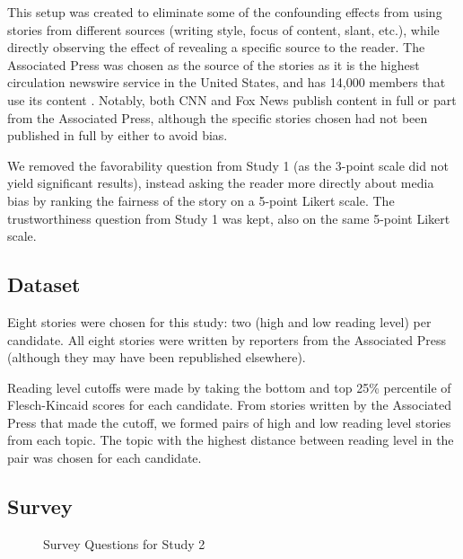 This setup was created to eliminate some of the confounding effects from using stories from different sources (writing style, focus of content, slant, etc.), while directly observing the effect of revealing a specific source to the reader. The Associated Press was chosen as the source of the stories as it is the highest circulation newswire service in the United States, and has 14,000 members that use its content \cite{apFAQ}. Notably, both CNN and Fox News publish content in full or part from the Associated Press, although the specific stories chosen had not been published in full by either to avoid bias.

We removed the favorability question from Study 1 (as the 3-point scale did not yield significant results), instead asking the reader more directly about media bias by ranking the fairness of the story on a 5-point Likert scale. The trustworthiness question from Study 1 was kept, also on the same 5-point Likert scale.


\subsection{Dataset} 
Eight stories were chosen for this study: two (high and low reading level) per candidate. All eight stories were written by reporters from the Associated Press (although they may have been republished elsewhere).

Reading level cutoffs were made by taking the bottom and top 25\% percentile of Flesch-Kincaid scores for each candidate. From stories written by the Associated Press that made the cutoff, we formed pairs of high and low reading level stories from each topic. The topic with the highest distance between reading level in the pair was chosen for each candidate.


 
 
 
\subsection{Survey}


\begin{figure}[h!] 
\centering
  \caption{Survey Questions for Study 2}
\end{figure}





